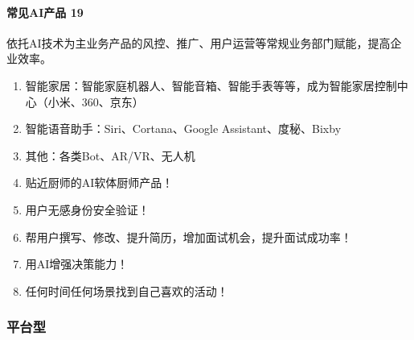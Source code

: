 \documentclass[letterpaper,11pt,english]{sphinxmanual}
\begin{document}
\paragraph{常见AI产品 19\sphinxfootnotemark[95]}
\label{\detokenize{chapter_introduction/2C:ai-19}}%
\begin{footnotetext}[95]\sphinxAtStartFootnote
{}
%
\end{footnotetext}\ignorespaces 
依托AI技术为主业务产品的风控、推广、用户运营等常规业务部门赋能，提高企业效率。%
\begin{footnote}[96]\sphinxAtStartFootnote
{}
%
\end{footnote}
\begin{enumerate}
%
\item {} 
智能家居：智能家庭机器人、智能音箱、智能手表等等，成为智能家居控制中心（小米、360、京东）

\item {} 
智能语音助手：Siri、Cortana、Google Assistant、度秘、Bixby

\item {} 
其他：各类Bot、AR/VR、无人机

\item {} 
贴近厨师的AI软体厨师产品！%
\begin{footnote}[97]\sphinxAtStartFootnote
{}
%
\end{footnote}

\item {} 
用户无感身份安全验证！

\item {} 
帮用户撰写、修改、提升简历，增加面试机会，提升面试成功率！

\item {} 
用AI增强决策能力！

\item {} 
任何时间任何场景找到自己喜欢的活动！

\end{enumerate}


\subsubsection{平台型}
\label{\detokenize{chapter_introduction/platform:id1}}\label{\detokenize{chapter_introduction/platform::doc}}
\end{document}
